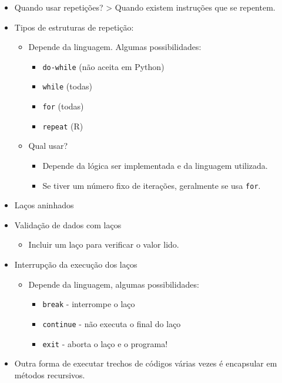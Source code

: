 \documentclass[12pt,a4paper]{article}
\providecommand{\tightlist}{%
      \setlength{\itemsep}{0pt}\setlength{\parskip}{0pt}}
\begin{document}
\begin{itemize}
\tightlist
\item
  Quando usar repetições? \textgreater{} Quando existem instruções que
  se repentem.
\item
  Tipos de estruturas de repetição:

  \begin{itemize}
  \tightlist
  \item
    Depende da linguagem. Algumas possibilidades:

    \begin{itemize}
    \tightlist
    \item
      \texttt{do-while} (não aceita em Python)
    \item
      \texttt{while} (todas)
    \item
      \texttt{for} (todas)
    \item
      \texttt{repeat} (R)
    \end{itemize}
  \item
    Qual usar?

    \begin{itemize}
    \tightlist
    \item
      Depende da lógica ser implementada e da linguagem utilizada.
    \item
      Se tiver um número fixo de iterações, geralmente se usa
      \texttt{for}.
    \end{itemize}
  \end{itemize}
\item
  Laços aninhados
\item
  Validação de dados com laços

  \begin{itemize}
  \tightlist
  \item
    Incluir um laço para verificar o valor lido.
  \end{itemize}
\item
  Interrupção da execução dos laços

  \begin{itemize}
  \tightlist
  \item
    Depende da linguagem, algumas possibilidades:

    \begin{itemize}
    \tightlist
    \item
      \texttt{break} - interrompe o laço
    \item
      \texttt{continue} - não executa o final do laço
    \item
      \texttt{exit} - aborta o laço e o programa!
    \end{itemize}
  \end{itemize}
\item
  Outra forma de executar trechos de códigos várias vezes é encapsular
  em métodos recursivos.


\end{itemize}
\end{document}
